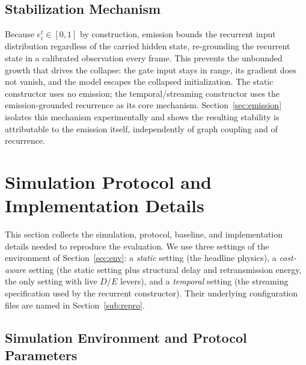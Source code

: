 \documentclass[journal]{IEEEtran}
\begin{document}
\subsection{Stabilization Mechanism}\label{sub:emitmech}

Because $e_i^t\in[0,1]$ by construction, emission bounds the recurrent input
distribution regardless of the carried hidden state, re-grounding the recurrent
state in a calibrated observation every frame. This prevents the unbounded growth
that drives the collapse: the gate input stays in range, its gradient does not
vanish, and the model escapes the collapsed initialization. The static
constructor uses no emission; the temporal/streaming constructor uses the
emission-grounded recurrence as its core mechanism. Section~\ref{sec:emission}
isolates this mechanism experimentally and shows the resulting stability is
attributable to the emission itself, independently of graph coupling and of
recurrence.

\section{Simulation Protocol and Implementation Details}\label{sec:setup}

This section collects the simulation, protocol, baseline, and implementation
details needed to reproduce the evaluation. We use three settings of the
environment of Section~\ref{sec:env}: a \emph{static} setting (the headline
physics), a \emph{cost-aware} setting (the static setting plus structural delay
and retransmission energy, the only setting with live $D$/$E$ levers), and a
\emph{temporal} setting (the streaming specification used by the recurrent
constructor). Their underlying configuration files are named in
Section~\ref{sub:repro}.

\subsection{Simulation Environment and Protocol Parameters}\label{sub:setupenv}
\end{document}
